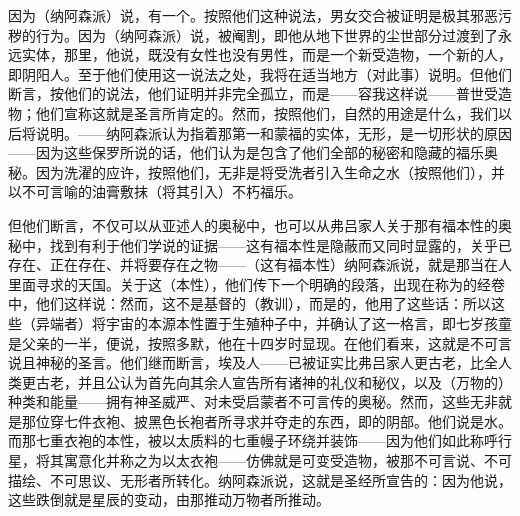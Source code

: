 因为（纳阿森派）说，有一个。按照他们这种说法，男女交合被证明是极其邪恶污秽的行为。因为（纳阿森派）说，被阉割，即他从地下世界的尘世部分过渡到了永远实体，那里，他说，既没有女性也没有男性，而是一个新受造物，一个新的人，即阴阳人。至于他们使用这一说法之处，我将在适当地方（对此事）说明。但他们断言，按他们的说法，他们证明并非完全孤立，而是——容我这样说——普世受造物；他们宣称这就是圣言所肯定的。然而，按照他们，自然的用途是什么，我们以后将说明。——纳阿森派认为指着那第一和蒙福的实体，无形，是一切形状的原因——因为这些保罗所说的话，他们认为是包含了他们全部的秘密和隐藏的福乐奥秘。因为洗濯的应许，按照他们，无非是将受洗者引入生命之水（按照他们），并以不可言喻的油膏敷抹（将其引入）不朽福乐。\par

但他们断言，不仅可以从亚述人的奥秘中，也可以从弗吕家人关于那有福本性的奥秘中，找到有利于他们学说的证据——这有福本性是隐蔽而又同时显露的，关乎已存在、正在存在、并将要存在之物——（这有福本性）纳阿森派说，就是那当在人里面寻求的天国。关于这（本性），他们传下一个明确的段落，出现在称为的经卷中，他们这样说：然而，这不是基督的（教训），而是的，他用了这些话：所以这些（异端者）将宇宙的本源本性置于生殖种子中，并确认了这一格言，即七岁孩童是父亲的一半，便说，按照多默，他在十四岁时显现。在他们看来，这就是不可言说且神秘的圣言。他们继而断言，埃及人——已被证实比弗吕家人更古老，比全人类更古老，并且公认为首先向其余人宣告所有诸神的礼仪和秘仪，以及（万物的）种类和能量——拥有神圣威严、对未受启蒙者不可言传的奥秘。然而，这些无非就是那位穿七件衣袍、披黑色长袍者所寻求并夺走的东西，即的阴部。他们说是水。而那七重衣袍的本性，被以太质料的七重幔子环绕并装饰——因为他们如此称呼行星，将其寓意化并称之为以太衣袍——仿佛就是可变受造物，被那不可言说、不可描绘、不可思议、无形者所转化。纳阿森派说，这就是圣经所宣告的：因为他说，这些跌倒就是星辰的变动，由那推动万物者所推动。\par

